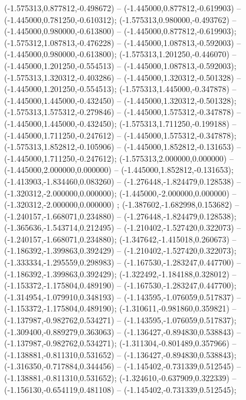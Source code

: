  (-1.575313,0.877812,-0.498672) -- (-1.445000,0.877812,-0.619903) -- (-1.445000,0.781250,-0.610312);
 (-1.575313,0.980000,-0.493762) -- (-1.445000,0.980000,-0.613800) -- (-1.445000,0.877812,-0.619903);
 (-1.575312,1.087813,-0.476228) -- (-1.445000,1.087813,-0.592003) -- (-1.445000,0.980000,-0.613800);
 (-1.575313,1.201250,-0.446070) -- (-1.445000,1.201250,-0.554513) -- (-1.445000,1.087813,-0.592003);
 (-1.575313,1.320312,-0.403286) -- (-1.445000,1.320312,-0.501328) -- (-1.445000,1.201250,-0.554513);
 (-1.575313,1.445000,-0.347878) -- (-1.445000,1.445000,-0.432450) -- (-1.445000,1.320312,-0.501328);
 (-1.575313,1.575312,-0.279846) -- (-1.445000,1.575312,-0.347878) -- (-1.445000,1.445000,-0.432450);
 (-1.575313,1.711250,-0.199188) -- (-1.445000,1.711250,-0.247612) -- (-1.445000,1.575312,-0.347878);
 (-1.575313,1.852812,-0.105906) -- (-1.445000,1.852812,-0.131653) -- (-1.445000,1.711250,-0.247612);
 (-1.575313,2.000000,0.000000) -- (-1.445000,2.000000,0.000000) -- (-1.445000,1.852812,-0.131653);
 (-1.413903,-1.834460,0.083260) -- (-1.276448,-1.824479,0.128538) -- (-1.320312,-2.000000,0.000000);
 (-1.445000,-2.000000,0.000000) -- (-1.320312,-2.000000,0.000000) ;
 (-1.387602,-1.682998,0.153682) -- (-1.240157,-1.668071,0.234880) -- (-1.276448,-1.824479,0.128538);
 (-1.365636,-1.543714,0.212495) -- (-1.210402,-1.527420,0.322073) -- (-1.240157,-1.668071,0.234880);
 (-1.347642,-1.415018,0.260673) -- (-1.186392,-1.399863,0.392429) -- (-1.210402,-1.527420,0.322073);
 (-1.333334,-1.295559,0.298983) -- (-1.167530,-1.283247,0.447700) -- (-1.186392,-1.399863,0.392429);
 (-1.322492,-1.184188,0.328012) -- (-1.153372,-1.175804,0.489190) -- (-1.167530,-1.283247,0.447700);
 (-1.314954,-1.079910,0.348193) -- (-1.143595,-1.076059,0.517837) -- (-1.153372,-1.175804,0.489190);
 (-1.310611,-0.981860,0.359821) -- (-1.137987,-0.982762,0.534271) -- (-1.143595,-1.076059,0.517837);
 (-1.309400,-0.889279,0.363063) -- (-1.136427,-0.894830,0.538843) -- (-1.137987,-0.982762,0.534271);
 (-1.311304,-0.801489,0.357966) -- (-1.138881,-0.811310,0.531652) -- (-1.136427,-0.894830,0.538843);
 (-1.316350,-0.717884,0.344456) -- (-1.145402,-0.731339,0.512545) -- (-1.138881,-0.811310,0.531652);
 (-1.324610,-0.637909,0.322339) -- (-1.156130,-0.654119,0.481108) -- (-1.145402,-0.731339,0.512545);
